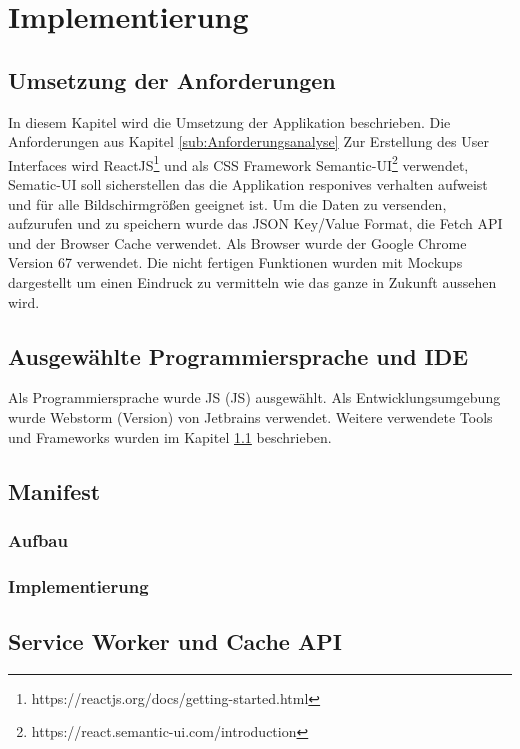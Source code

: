 \chapter{Implementierung}\label{chap:Implementierung}
\thispagestyle{standard}
\pagestyle{standard}

\section{Umsetzung der Anforderungen}\label{sub:Umsetzung der Anforderungen}
In diesem Kapitel wird die Umsetzung der Applikation beschrieben. Die Anforderungen aus Kapitel \ref{sub:Anforderungsanalyse}
Zur Erstellung des User Interfaces wird ReactJS\footnote{https://reactjs.org/docs/getting-started.html} und als CSS Framework Semantic-UI\footnote{https://react.semantic-ui.com/introduction} verwendet, Sematic-UI soll sicherstellen das die Applikation responives verhalten aufweist und für alle Bildschirmgrößen geeignet ist. Um die Daten zu versenden, aufzurufen und zu speichern wurde das JSON Key/Value Format, die Fetch API und der Browser Cache verwendet.
Als Browser wurde der Google Chrome Version 67 verwendet.
Die nicht fertigen Funktionen wurden mit Mockups dargestellt um einen Eindruck zu vermitteln wie das ganze in Zukunft aussehen wird.

\section{Ausgewählte Programmiersprache und IDE}
Als Programmiersprache wurde \acl{JS} (\acs{JS}) ausgewählt. 
Als Entwicklungsumgebung wurde Webstorm (Version) von Jetbrains verwendet. 
Weitere verwendete Tools und Frameworks wurden im Kapitel \ref{sub:Umsetzung der Anforderungen} beschrieben.


\section{Manifest}
\subsection{Aufbau}
\subsection{Implementierung}



\section{Service Worker und Cache API}

